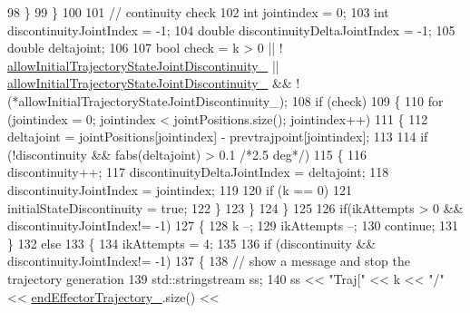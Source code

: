 \begin{DoxyCode}
98                     \}
99                 \}
100 
101                 \textcolor{comment}{// continuity check}
102                 \textcolor{keywordtype}{int} jointindex = 0;
103                 \textcolor{keywordtype}{int} discontinuityJointIndex = -1;
104                 \textcolor{keywordtype}{double} discontinuityDeltaJointIndex = -1;
105                 \textcolor{keywordtype}{double} deltajoint;
106 
107                 \textcolor{keywordtype}{bool} check = k > 0 || !
      \hyperlink{classcl__move__group__interface_1_1CbMoveEndEffectorTrajectory_a01e02533602d045538fd8ccc9a011ea7}{allowInitialTrajectoryStateJointDiscontinuity\_} || 
      \hyperlink{classcl__move__group__interface_1_1CbMoveEndEffectorTrajectory_a01e02533602d045538fd8ccc9a011ea7}{allowInitialTrajectoryStateJointDiscontinuity\_} && !
      (*allowInitialTrajectoryStateJointDiscontinuity\_);
108                 \textcolor{keywordflow}{if} (check)
109                 \{
110                     \textcolor{keywordflow}{for} (jointindex = 0; jointindex < jointPositions.size(); jointindex++)
111                     \{
112                         deltajoint = jointPositions[jointindex] - prevtrajpoint[jointindex];
113 
114                         \textcolor{keywordflow}{if} (!discontinuity && fabs(deltajoint) > 0.1 \textcolor{comment}{/*2.5 deg*/})
115                         \{
116                             discontinuity++;
117                             discontinuityDeltaJointIndex = deltajoint;
118                             discontinuityJointIndex = jointindex;
119 
120                             \textcolor{keywordflow}{if} (k == 0)
121                                 initialStateDiscontinuity = \textcolor{keyword}{true};
122                         \}
123                     \}
124                 \}
125 
126                 \textcolor{keywordflow}{if}(ikAttempts > 0 && discontinuityJointIndex!= -1)
127                 \{
128                     k --;
129                     ikAttempts --;
130                     \textcolor{keywordflow}{continue};
131                 \}
132                 \textcolor{keywordflow}{else}
133                 \{
134                     ikAttempts = 4;
135                 
136                     \textcolor{keywordflow}{if} (discontinuity && discontinuityJointIndex!= -1)
137                     \{
138                         \textcolor{comment}{// show a message and stop the trajectory generation}
139                         std::stringstream ss;
140                         ss << \textcolor{stringliteral}{"Traj["} << k << \textcolor{stringliteral}{"/"} << \hyperlink{classcl__move__group__interface_1_1CbMoveEndEffectorTrajectory_ae13dfd31ea3660646e03882f0c2c29f0}{endEffectorTrajectory\_}.size() <<

\end{DoxyCode}

